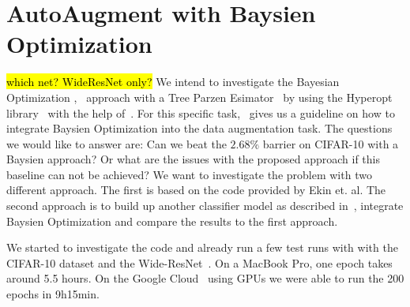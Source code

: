 \documentclass[10pt,twocolumn,letterpaper]{article}
\begin{document}
\section{AutoAugment with Baysien Optimization}
\hl{which net? WideResNet only?}\newline
We intend to investigate the Bayesian Optimization \cite{2018arXiv180702811F},~\cite{Goodfellow-et-al-2016} approach with a Tree Parzen Esimator~\cite{Kaggle_AMT} by using the Hyperopt library~\cite{HyperOpt} with the help of~\cite{BO_Hyperopt}. For this specific task,~\cite{2017arXiv171010564T} gives us a guideline on how to integrate Baysien Optimization into the data augmentation task. The questions we would like to answer are: Can we beat the $2.68\%$ barrier on CIFAR-10 with a Baysien approach? Or what are the issues with the proposed approach if this baseline can not be achieved?
We want to investigate the problem with two different approach. The first is based on the code provided by Ekin et. al. The second approach is to build up another classifier model as described in~\cite{cifar-10-cl}, integrate Baysien Optimization and compare the results to the first approach.

We started to investigate the code and already run a few test runs with with the CIFAR-10 dataset and the Wide-ResNet~\cite{Ekin}. On a MacBook Pro, one epoch takes around 5.5 hours. On the Google Cloud~\cite{GCloud} using GPUs we were able to run the 200 epochs in 9h15min.




{\small


}
\end{document}
